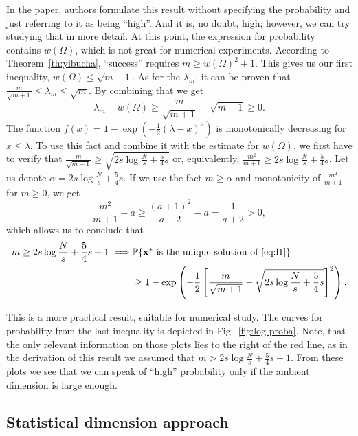 \begin{remark}
    In the paper, authors formulate this result without specifying the probability and just referring to it as being ``high''.
    And it is, no doubt, high; however, we can try studying that in more detail.
    At this point, the expression for probability contains $w(\Omega)$, which is not great for numerical experiments.
    According to Theorem~\ref{th:yibucha}, ``success'' requires $m \geq w(\Omega)^2+1$.
    This gives us our first inequality, $w(\Omega) \leq \sqrt{m-1}$.
    As for the $\lambda_m$, it can be proven that $\frac{m}{\sqrt{m+1}} \leq \lambda_m \leq \sqrt{m}$.
    By combining that we get \[\lambda_m - w(\Omega) \geq \frac{m}{\sqrt{m+1}} - \sqrt {m-1} \geq 0.\]
    The function $f(x) = 1 - \exp\left(-\frac{1}{2}(\lambda-x)^2\right)$ is monotonically decreasing for $x \leq \lambda$.
    To use this fact and combine it with the estimate for $w(\Omega)$, we first have to verify that $\frac{m}{\sqrt{m+1}} \geq \sqrt {2s \log \frac{N}{s} + \frac{5}{4}s}$
    or, equivalently, $\frac{m^2}{m+1} \geq 2s \log \frac{N}{s} + \frac{5}{4}s$.
    Let us denote $\alpha = 2s \log \frac{N}{s} + \frac{5}{4}s$.
    If we use the fact $m \geq \alpha$ and monotonicity of $\frac{m^2}{m+1}$ for $m \geq 0$, we get
    \[ \frac{m^2}{m+1} - a \geq \frac{(a+1)^2}{a+2} - a = \frac{1}{a+2} > 0,\]
    which allows us to conclude that
    \begin{align}
         m \geq 2s\log \frac{N}{s} + \frac{5}{4}s + 1 \implies &\mathbb{P}\{\mathbf{x}^* \text{ is the unique solution of \ref{eq:l1}}\} \nonumber \\
    & \geq 1 - \exp \left( - \frac{1}{2} \left[\frac{m}{\sqrt{m+1}} - \sqrt {2s \log \frac{N}{s}+\frac{5}{4}s}\right]^2 \right) \label{eq:log_improved}.
    \end{align}

    This is a more practical result, suitable for numerical study.
    The curves for probability from the last inequality is depicted in Fig.~\ref{fig:log-proba}.
    Note, that the only relevant information on those plots lies to the right of the red line, as in the derivation of this
    result we assumed that $m > 2s \log \frac{N}{s} + \frac{5}{4}s + 1$.
    From these plots we see that we can speak of ``high'' probability only if the ambient dimension is large enough.
\end{remark}

\subsection{Statistical dimension approach}

